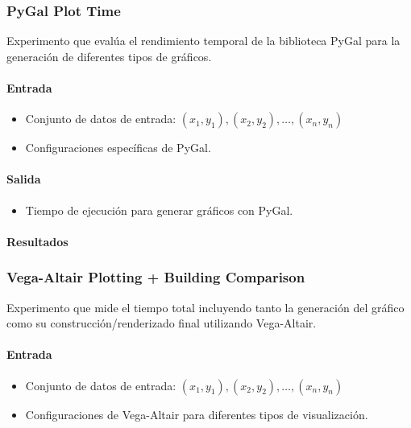 \VegaAltairPlotTimeComparison

\subsubsection{PyGal Plot Time}
\label{pygal_plot_time}

Experimento que evalúa el rendimiento temporal de la biblioteca PyGal para la generación de diferentes tipos de gráficos.

\paragraph{Entrada}
\begin{itemize}
    \item Conjunto de datos de entrada: \( (x_1, y_1), (x_2, y_2), \ldots, (x_n, y_n) \)
    \item Configuraciones específicas de PyGal.
\end{itemize}

\paragraph{Salida}
\begin{itemize}
    \item Tiempo de ejecución para generar gráficos con PyGal.
\end{itemize}

\paragraph{Resultados}
\vspace{0.5em}
\noindent

\PyGalPlotTime

\subsubsection{Vega-Altair Plotting + Building Comparison}
\label{vega_altair_plot_plus_build_time}

Experimento que mide el tiempo total incluyendo tanto la generación del gráfico como su construcción/renderizado final utilizando Vega-Altair.

\paragraph{Entrada}
\begin{itemize}
    \item Conjunto de datos de entrada: \( (x_1, y_1), (x_2, y_2), \ldots, (x_n, y_n) \)
    \item Configuraciones de Vega-Altair para diferentes tipos de visualización.
\end{itemize}

